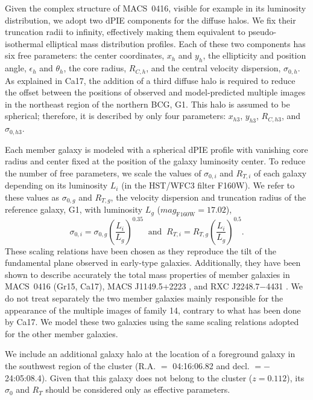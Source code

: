 \documentclass[twocolumn]{aastex61}
\begin{document}
Given the complex structure of MACS~0416, visible for example in its luminosity
distribution, we adopt two dPIE components for the diffuse halos.
We fix their truncation radii to infinity, effectively making them equivalent to 
pseudo-isothermal elliptical mass distribution \citep[hereafter PIEMD;][]{Kassiola1993} profiles.
Each of these two components has six free parameters: the center coordinates, $x_h$ and
$y_h$, the ellipticity and position angle, $\epsilon_h$ and $\theta_h$, the core
radius, $R_{C,h}$, and the central velocity dispersion, $\sigma_{0,h}$.
As explained in Ca17, the addition of a third diffuse halo is
required to reduce the offset between the positions of observed and model-predicted multiple
images in the northeast region of the northern BCG, G1.
This halo is assumed to be spherical; therefore, it is described by only four
parameters: $x_{h3}$, $y_{h3}$, $R_{C,h3}$, and $\sigma_{0,h3}$.

Each member galaxy is modeled with a spherical dPIE profile with vanishing core
radius and center fixed at the position of the galaxy luminosity center.
To reduce the number of free parameters, we scale the values of $\sigma_{0,i}$
and $R_{T,i}$ of each galaxy depending on its luminosity $L_i$ (in the HST/WFC3
filter F160W).
We refer to these values as $\sigma_{0,g}$ and $R_{T,g}$, the velocity dispersion and truncation
radius of the reference galaxy, G1, with luminosity $L_{g}$
($mag_{\text{F160W}} = 17.02$),
\begin{equation}
\sigma_{0,i} = \sigma_{0,g} \left( \frac{L_i}{L_g} \right)^{0.35} \;\; \text{and}  \;\;
R_{T,i} = R_{T,g} \left( \frac{L_i}{L_g} \right)^{0.5}.
\end{equation}
These scaling relations have been chosen as they reproduce the tilt of the
fundamental plane \citep{Faber1987,Bender1992} observed in early-type galaxies.
Additionally, they have been shown to describe accurately the total mass
properties of member galaxies in MACS~0416 (Gr15, Ca17), MACS J1149.5+2223
\citep{Grillo2016}, and RXC J2248.7$-$4431 \citep{Caminha2016a}.
We do not treat separately the two member galaxies mainly responsible for the
appearance of the multiple images of family 14, contrary to what has been done by Ca17.
We model these two galaxies using the same scaling relations adopted for the
other member galaxies.

We include an additional galaxy halo at the location of a foreground
galaxy in the southwest region of the cluster (R.A. $=$ 04:16:06.82 and
decl. $= -$24:05:08.4).
Given that this galaxy does not belong to the cluster ($z=0.112$), its
$\sigma_0$ and $R_T$ should be considered only as effective parameters.
\end{document}
